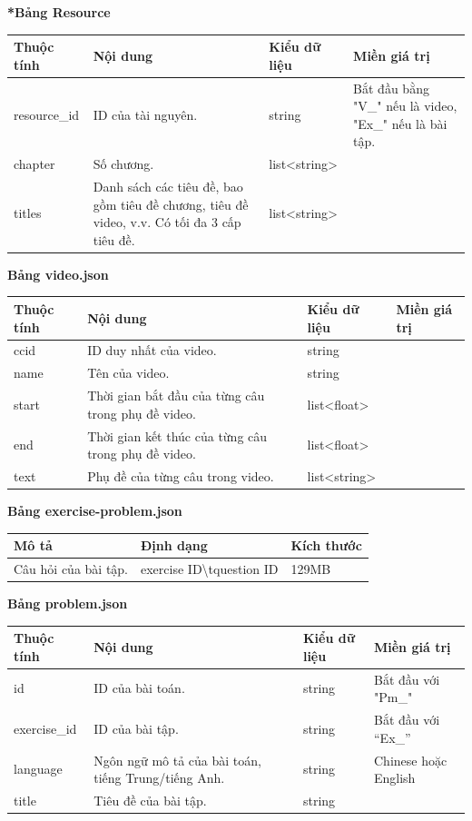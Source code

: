 \textbf{*Bảng Resource}
\begin{center}
\begin{tabular}{|| m{6em}  m{10em}  m{8em}  m{8em}||} 
 \hline
 \textbf{Thuộc tính} & \textbf{Nội dung} & \textbf{Kiểu dữ liệu} & \textbf{Miền giá trị} \\ [0.5ex] 
 \hline\hline
 resource\_id & ID của tài nguyên. & string & Bắt đầu bằng "V\_" nếu là video, "Ex\_" nếu là bài tập. \\ 
 \hline
 chapter & Số chương. & list<string> & \\
 \hline
 titles & Danh sách các tiêu đề, bao gồm tiêu đề chương, tiêu đề video, v.v. Có tối đa 3 cấp tiêu đề. & list<string> &  \\ [1ex] 
 \hline
\end{tabular}
\end{center}
\newpage
\textbf{Bảng video.json}
\begin{center}
\begin{tabular}{|| m{6em}  m{10em}  m{8em}  m{8em}||} 
 \hline
 \textbf{Thuộc tính} & \textbf{Nội dung} & \textbf{Kiểu dữ liệu} & \textbf{Miền giá trị} \\ [0.5ex] 
 \hline\hline
 ccid & ID duy nhất của video. & string &  \\ 
 \hline
 name & Tên của video. & string & \\
 \hline
 start & Thời gian bắt đầu của từng câu trong phụ đề video. & list<float> & \\
 \hline
 end & Thời gian kết thúc của từng câu trong phụ đề video. & list<float> &  \\ \hline
 text & Phụ đề của từng câu trong video. & list<string> &  \\ [1ex] 
 \hline
\end{tabular}
\end{center}
\textbf{Bảng exercise-problem.json}
\begin{center}
\begin{tabular}{|| m{11em}  m{11em}  m{9em} ||} 
 \hline
 \textbf{Mô tả} & \textbf{Định dạng} & \textbf{Kích thước} \\ [0.5ex] 
 \hline\hline
 Câu hỏi của bài tập. & {exercise ID}\textbackslash t{question ID} & 129MB \\ [1ex] 
 \hline
\end{tabular}
\end{center}
\textbf{Bảng problem.json}
\begin{center}
\begin{tabular}{|| m{6em}  m{10em}  m{6em}  m{11em}||} 
 \hline
 \textbf{Thuộc tính} & \textbf{Nội dung} & \textbf{Kiểu dữ liệu} & \textbf{Miền giá trị} \\ [0.5ex] 
 \hline\hline
 id & ID của bài toán. & string & Bắt đầu với "Pm\_"\\
 \hline
 exercise\_id & ID của bài tập. & string & Bắt đầu với “Ex\_” \\ \hline
 language & Ngôn ngữ mô tả của bài toán, tiếng Trung/tiếng Anh. & string & Chinese hoặc English \\ 
 \hline
 title & Tiêu đề của bài tập. & string &  \\ [1ex] 
 \hline
\end{tabular}
\end{center}
